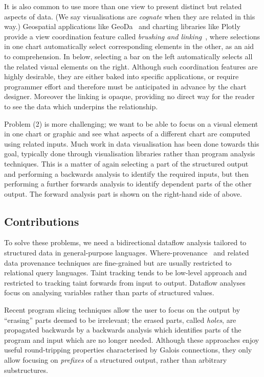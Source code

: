 It is also common to use more than one view to present distinct but related aspects of data. (We say visualisations are \emph{cognate} when they are related in this way.) Geospatial applications like GeoDa~\cite{anselin06} and charting libraries like Plotly provide a view coordination feature called \emph{brushing and linking}~\cite{becker87}, where selections in one chart automatically select corresponding elements in the other, as an aid to comprehension. In  below, selecting a bar on the left automatically selects all the related visual elements on the right. Although such coordination features are highly desirable, they are either baked into specific applications, or require programmer effort and therefore must be anticipated in advance by the chart designer. Moreover the linking is opaque, providing no direct way for the reader to see the data which underpins the relationship.

Problem (2) is more challenging; we want to be able to focus on a visual element in one chart or graphic and see what aspects of a different chart are computed using related inputs. Much work in data visualisation has been done towards this goal, typically done through visualisation libraries rather than program analysis techniques. This is a matter of again selecting a part of the structured output and performing a backwards analysis to identify the required inputs, but then performing a further forwards analysis to identify dependent parts of the other output. The forward analysis part is shown on the right-hand side of  above.

\subsection{Contributions}

To solve these problems, we need a bidirectional dataflow analysis tailored to structured data in general-purpose languages. Where-provenance~\cite{buneman01} and related data provenance techniques are fine-grained but are usually restricted to relational query languages. Taint tracking \cite{newsome05} tends to be low-level approach and restricted to tracking taint forwards from input to output. Dataflow analyses \cite{reps95} focus on analysing variables rather than parts of structured values.

Recent program slicing techniques \cite{perera12a,perera13a,ricciotti17} allow the user to focus on the output by ``erasing'' parts deemed to be irrelevant; the erased parts, called \emph{holes}, are propagated backwards by a backwards analysis which identifies parts of the program and input which are no longer needed. Although these approaches enjoy useful round-tripping properties characterised by Galois connections, they only allow focusing on \emph{prefixes} of a structured output, rather than arbitrary substructures.

